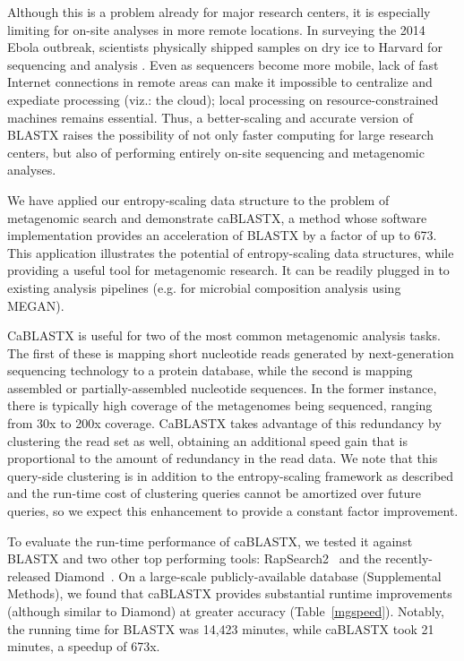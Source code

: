 \documentclass[review,preprint,12pt]{elsarticle}
\renewcommand{\cite}{\citep} %
\theoremstyle{definition}
\theoremstyle{remark}
\numberwithin{equation}{section}
\begin{document}
Although this is a problem already for major research centers, it is especially
limiting for on-site analyses in more remote locations.
In surveying the 2014 Ebola outbreak, scientists physically shipped samples on 
dry ice to Harvard for sequencing and analysis \cite{gire2014genomic}.
Even as sequencers become more mobile, lack of fast Internet connections in remote
areas can make it impossible to centralize and expediate processing (viz.: the cloud);
local processing on resource-constrained machines remains essential.
Thus, a better-scaling and accurate version of BLASTX raises the possibility of 
not only faster computing for large research centers, but also of performing
entirely on-site sequencing and metagenomic analyses.

We have applied our entropy-scaling data structure to the problem of 
metagenomic search and demonstrate caBLASTX, a method whose software 
implementation provides an acceleration of BLASTX by a factor of up 
to 673.
This application illustrates the potential of entropy-scaling data structures, while
providing a useful tool for metagenomic research.
It can be readily plugged in to existing analysis pipelines (e.g. for microbial 
composition analysis using MEGAN).

CaBLASTX is useful for two of the most common metagenomic analysis tasks. 
The first of these is mapping short nucleotide reads generated by next-generation sequencing technology to a protein database,
while the second is mapping assembled or partially-assembled
nucleotide sequences.
In the former instance, there is typically high coverage of the metagenomes
being sequenced, ranging from 30x to 200x coverage.
CaBLASTX takes advantage of this redundancy
by clustering the read set as well, obtaining an additional speed gain that is
proportional to the amount of redundancy in the read data.
We note that this query-side clustering is in addition to the entropy-scaling
framework as described and the run-time cost of clustering queries cannot
be amortized over future queries, so
we expect this enhancement to provide a 
constant factor improvement.

To evaluate the run-time performance of caBLASTX, we tested it against
BLASTX and two other top performing tools: RapSearch2~\cite{zhao2012rapsearch2} and the recently-released
Diamond~\cite{buchfink2014fast}.
On a large-scale publicly-available database (Supplemental Methods), we found that caBLASTX provides substantial runtime improvements 
(although similar to Diamond) at greater accuracy (Table~\ref{mgspeed}).
Notably, the running time for BLASTX was 14,423 minutes, 
while caBLASTX took 21 minutes, a speedup of 673x.
\end{document}
